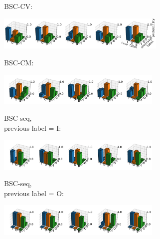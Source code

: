 \begin{figure}
\begin{minipage}[b][1cm][l]{0.2\textwidth} 
BSC-CV:
\end{minipage}
  \includegraphics[width=0.72\textwidth, clip=True, trim=0 4 0 3]{figures/worker_models/vec} 
  \\
\begin{minipage}[b][1cm][l]{0.2\textwidth} 
BSC-CM:
\end{minipage}
  \includegraphics[width=0.7\textwidth, clip=True, trim=20 20 0 28]{figures/worker_models/ibcc}
 \\
\begin{minipage}[b][1cm][l]{0.2\textwidth} 
BSC-seq, \\
previous label = I:
\end{minipage}
  \includegraphics[width=0.7\textwidth, clip=True, trim=20 20 0 28]{figures/worker_models/seq_prev0}
\\
\begin{minipage}[b][1cm][l]{0.2\textwidth} 
BSC-seq, \\
previous label = O:
\end{minipage}
  \includegraphics[width=0.7\textwidth, clip=True, trim=20 20 0 28]{figures/worker_models/seq_prev1}
\\
\begin{minipage}[b][1cm][l]{0.2\textwidth} 

\end{minipage}
\end{figure}
